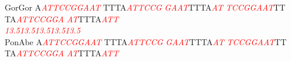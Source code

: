 \documentclass[11pt,twoside,reqno,a4paper]{article}
\begin{document}
{GorGor	A\textit{\textcolor{red}{A}}\textit{\textcolor{red}{T}}\textit{\textcolor{red}{T}}\textit{\textcolor{red}{C}}\textit{\textcolor{red}{C}}\textit{\textcolor{red}{G}}\textit{\textcolor{red}{G}}\textit{\textcolor{red}{A}}\textit{\textcolor{red}{A}}\textit{\textcolor{red}{T}}	TTTA\textit{\textcolor{red}{A}}\textit{\textcolor{red}{T}}\textit{\textcolor{red}{T}}\textit{\textcolor{red}{C}}\textit{\textcolor{red}{C}}\textit{\textcolor{red}{G}}	\textit{\textcolor{red}{G}}\textit{\textcolor{red}{A}}\textit{\textcolor{red}{A}}\textit{\textcolor{red}{T}}TTTA\textit{\textcolor{red}{A}}\textit{\textcolor{red}{T}}	\textit{\textcolor{red}{T}}\textit{\textcolor{red}{C}}\textit{\textcolor{red}{C}}\textit{\textcolor{red}{G}}\textit{\textcolor{red}{G}}\textit{\textcolor{red}{A}}\textit{\textcolor{red}{A}}\textit{\textcolor{red}{T}}TT	TA\textit{\textcolor{red}{A}}\textit{\textcolor{red}{T}}\textit{\textcolor{red}{T}}\textit{\textcolor{red}{C}}\textit{\textcolor{red}{C}}\textit{\textcolor{red}{G}}\textit{\textcolor{red}{G}}\textit{\textcolor{red}{A}}	\textit{\textcolor{red}{A}}\textit{\textcolor{red}{T}}TTTA\textit{\textcolor{red}{A}}\textit{\textcolor{red}{T}}\textit{\textcolor{red}{T}}\\
\hspace*{7\charwidth}\hspace*{1\charwidth}\textit{\textcolor{red}{13.5}}\hspace*{1\charwidth}\hspace*{10\charwidth}\textit{\textcolor{red}{13.5}}\hspace*{1\charwidth}\hspace*{10\charwidth}\textit{\textcolor{red}{13.5}}\hspace*{1\charwidth}\hspace*{1\charwidth}\hspace*{10\charwidth}\textit{\textcolor{red}{13.5}}\hspace*{1\charwidth}\hspace*{10\charwidth}\textit{\textcolor{red}{13.5}}\hspace*{1\charwidth}\\
PonAbe	A\textit{\textcolor{red}{A}}\textit{\textcolor{red}{T}}\textit{\textcolor{red}{T}}\textit{\textcolor{red}{C}}\textit{\textcolor{red}{C}}\textit{\textcolor{red}{G}}\textit{\textcolor{red}{G}}\textit{\textcolor{red}{A}}\textit{\textcolor{red}{A}}\textit{\textcolor{red}{T}}	TTTA\textit{\textcolor{red}{A}}\textit{\textcolor{red}{T}}\textit{\textcolor{red}{T}}\textit{\textcolor{red}{C}}\textit{\textcolor{red}{C}}\textit{\textcolor{red}{G}}	\textit{\textcolor{red}{G}}\textit{\textcolor{red}{A}}\textit{\textcolor{red}{A}}\textit{\textcolor{red}{T}}TTTA\textit{\textcolor{red}{A}}\textit{\textcolor{red}{T}}	\textit{\textcolor{red}{T}}\textit{\textcolor{red}{C}}\textit{\textcolor{red}{C}}\textit{\textcolor{red}{G}}\textit{\textcolor{red}{G}}\textit{\textcolor{red}{A}}\textit{\textcolor{red}{A}}\textit{\textcolor{red}{T}}TT	TA\textit{\textcolor{red}{A}}\textit{\textcolor{red}{T}}\textit{\textcolor{red}{T}}\textit{\textcolor{red}{C}}\textit{\textcolor{red}{C}}\textit{\textcolor{red}{G}}\textit{\textcolor{red}{G}}\textit{\textcolor{red}{A}}	\textit{\textcolor{red}{A}}\textit{\textcolor{red}{T}}TTTA\textit{\textcolor{red}{A}}\textit{\textcolor{red}{T}}\textit{\textcolor{red}{T}}\\
}
\end{document}
